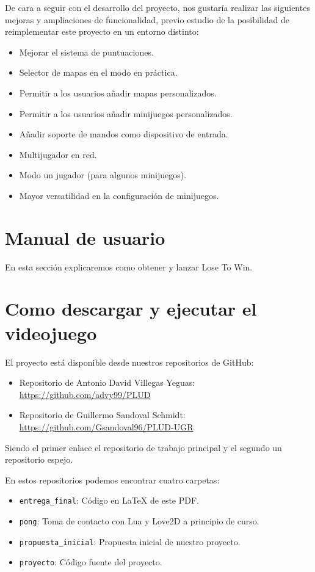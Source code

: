 \documentclass[12pt, spanish]{article}
\begin{document}
De cara a seguir con el desarrollo del proyecto, nos gustaría realizar las siguientes mejoras y ampliaciones de funcionalidad, previo estudio de la posibilidad de reimplementar este proyecto en un entorno distinto:

\begin{itemize}
	\item Mejorar el sistema de puntuaciones.
	\item Selector de mapas en el modo en práctica.
	\item Permitir a los usuarios añadir mapas personalizados.
	\item Permitir a los usuarios añadir minijuegos personalizados.
	\item Añadir soporte de mandos como dispositivo de entrada.
	\item Multijugador en red.
	\item Modo un jugador (para algunos minijuegos).
	\item Mayor versatilidad en la configuración de minijuegos.
\end{itemize}


\section*{Manual de usuario}
\label{sec:manual}

En esta sección explicaremos como obtener y lanzar Lose To Win.

\section{Como descargar y ejecutar el videojuego}

El proyecto está disponible desde nuestros repositorios de GitHub:

\begin{itemize}
	\item Repositorio de Antonio David Villegas Yeguas: \url{https://github.com/advy99/PLUD}
	\item Repositorio de Guillermo Sandoval Schmidt: \url{https://github.com/Gsandoval96/PLUD-UGR}
\end{itemize}

Siendo el primer enlace el repositorio de trabajo principal y el segundo un repositorio espejo.

En estos repositorios podemos encontrar cuatro carpetas:

\begin{itemize}
	\item \texttt{entrega\_final}: Código en LaTeX de este PDF.
	\item \texttt{pong}: Toma de contacto con Lua y Love2D a principio de curso.
	\item \texttt{propuesta\_inicial}: Propuesta inicial de nuestro proyecto.
	\item \texttt{proyecto}: Código fuente del proyecto.
\end{itemize}
\end{document}
